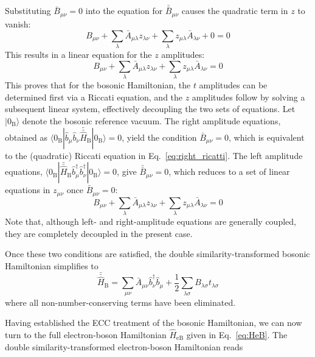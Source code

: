 Substituting $\bar{B}_{\mu\nu} = 0$ into the equation for $\bar{\bar{B}}_{\mu\nu}$ causes the quadratic term in $z$ to vanish:
\begin{equation}
    B_{\mu \nu} + \sum_{\lambda} \bar{A}_{\mu \lambda} z_{\lambda \nu} + \sum_\lambda z_{\mu \lambda} \bar{A}_{\lambda \nu} + 0 = 0
\end{equation}
This results in a linear equation for the $z$ amplitudes:
\begin{equation}
	B_{\mu \nu} + \sum_{\lambda} \bar{A}_{\mu \lambda} z_{\lambda \nu} + \sum_\lambda z_{\mu \lambda} \bar{A}_{\lambda \nu} = 0
\end{equation}
This proves that for the bosonic Hamiltonian, the $t$ amplitudes can be determined first via a Riccati equation, and the $z$ amplitudes follow by solving a subsequent linear system, effectively decoupling the two sets of equations.
Let $|0_{\mathrm{B}}\rangle$ denote the bosonic reference vacuum.
The right amplitude equations, obtained as $\langle 0_{\mathrm{B}}| \hat{b}_{\mu} \hat{b}_{\nu} \bar{\bar{\hat{H}}}_{\mathrm{B}} |0_{\mathrm{B}}\rangle = 0$, yield the condition $\bar{B}_{\mu \nu} = 0$, which is equivalent to the (quadratic) Riccati equation in Eq.~\eqref{eq:right_ricatti}.
The left amplitude equations, $\langle 0_{\mathrm{B}}| \bar{\bar{\hat{H}}}_{\mathrm{B}} \hat{b}^\dagger_{\mu} \hat{b}^\dagger_{\nu} |0_{\mathrm{B}}\rangle = 0$, give $\bar{\bar{B}}_{\mu \nu} = 0$, which reduces to a set of linear equations in $z_{\mu\nu}$ once $\bar{B}_{\mu \nu} = 0$:
\begin{equation}
	B_{\mu \nu} + \sum_{\lambda} \bar{A}_{\mu \lambda} z_{\lambda \nu} + \sum_\lambda z_{\mu \lambda} \bar{A}_{\lambda \nu} = 0
\end{equation}
Note that, although left- and right-amplitude equations are generally coupled, they are completely decoupled in the present case. 

Once these two conditions are satisfied, the double similarity-transformed bosonic Hamiltonian simplifies to
\begin{equation}
		\bar{\bar{\hat{H}}}_{\mathrm{B}} = \sum_{\mu \nu} \bar{A}_{\mu \nu} \hat{b}^\dagger_{\nu} \hat{b}_{\mu} + \frac{1}{2} \sum_{\lambda \sigma} B_{\lambda \sigma} t_{\lambda \sigma} 
\end{equation}
where all non-number-conserving terms have been eliminated.

Having established the ECC treatment of the bosonic Hamiltonian, we can now turn to the full electron-boson Hamiltonian $\hat{H}_{\mathrm{eB}}$ given in Eq.~\eqref{eq:HeB}.
The double similarity-transformed electron-boson Hamiltonian reads


